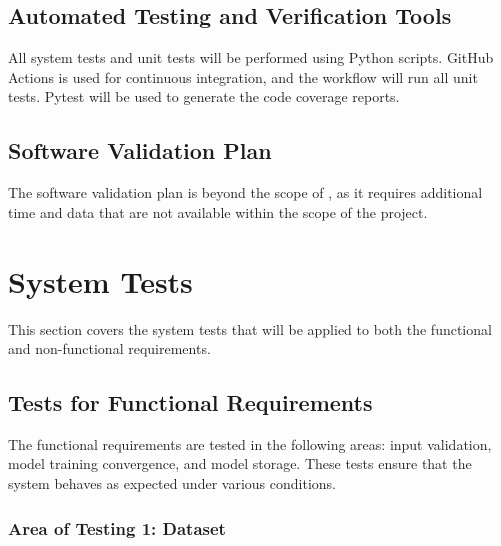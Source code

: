 \documentclass[12pt, titlepage]{article}
\begin{document}
\subsection{Automated Testing and Verification Tools}
All system tests and unit tests will be performed using Python scripts.  
GitHub Actions is used for continuous integration, and the workflow will run all unit tests.
Pytest will be used to generate the code coverage reports.

\subsection{Software Validation Plan}

The software validation plan is beyond the scope of \progname, as it requires additional time and data that are not available within the scope of the project.

\section{System Tests}\label{SystemTest}

This section covers the system tests that will be applied to both the functional and non-functional requirements.

\subsection{Tests for Functional Requirements}

The functional requirements are tested in the following areas: input validation, model training convergence, and model storage. These tests ensure that the system behaves as expected under various conditions.

\subsubsection{Area of Testing 1: Dataset}
\end{document}
